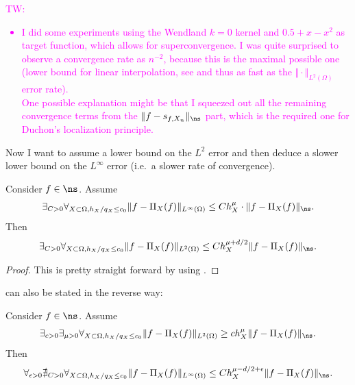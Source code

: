 \documentclass[a4paper, 10pt]{article}
\newcommand{\tw}[1]{\textcolor{magenta}{TW: #1}}
\begin{document}
\tw{
\begin{itemize}
\item I did some experiments using the Wendland $k=0$ kernel and $0.5 + x - x^2$ as target function, which allows for superconvergence.
I was quite surprised to observe a convergence rate as $n^{-2}$, because this is the maximal possible one (lower bound for linear interpolation, see \cite{wenzel2023analysis} and thus as fast as the $\Vert \cdot \Vert_{L^2(\Omega)}$ error rate). \\
One possible explanation might be that I squeezed out all the remaining convergence terms from the $\Vert f - s_{f, X_n} \Vert_{\ns}$ part, which is the required one for Duchon's localization principle.
\end{itemize}
}

Now I want to assume a lower bound on the $L^2$ error and then deduce a slower lower bound on the $L^\infty$ error (i.e.\ a slower rate of convergence).

\begin{lemma}
\label{lem:faster_L2_convergence}
Consider $f \in \ns$. Assume
\begin{align*}
\exists_{C>0} \forall_{X \subset \Omega, h_X/q_X \leq c_0} \Vert f - \Pi_X(f) \Vert_{L^\infty(\Omega)} \leq C h_X^\mu \cdot \Vert f - \Pi_X(f) \Vert_{\ns}.
\end{align*}
Then
\begin{align*}
\exists_{C > 0} \forall_{X \subset \Omega, h_X/q_X \leq c_0} \Vert f - \Pi_{X}(f) \Vert_{L^2(\Omega)} \leq C h_X^{\mu + d/2} \Vert f - \Pi_{X}(f) \Vert_{\ns}.
\end{align*}
\end{lemma}

\begin{proof}
This is pretty straight forward by using \cite{wendland1999meshless}.
\end{proof}

\noindent {} can also be stated in the reverse way:

\begin{lemma}
\label{lem:bounded_Linfty_convergence}
Consider $f \in \ns$.
Assume
\begin{align}
\label{eq:lower_L2_bound}
\exists_{c>0} \exists_{\mu > 0} \forall_{X \subset \Omega, h_X / q_X \leq c_0} \Vert f - \Pi_{X}(f) \Vert_{L^2(\Omega)} \geq c h_X^{\mu} \Vert f - \Pi_{X}(f) \Vert_{\ns}.
\end{align}
Then
\begin{align}
\label{eq:no_upper_Linfty_bound}
\forall_{\epsilon > 0} \nexists_{C > 0} \forall_{X \subset \Omega, h_X / q_X \leq c_0} \Vert f - \Pi_{X}(f) \Vert_{L^\infty(\Omega)} \leq C h_X^{\mu - d/2 + \epsilon} \Vert f - \Pi_{X}(f) \Vert_{\ns}.
\end{align}
%
%
%
%
%
%
%
%
\end{lemma}
\end{document}
